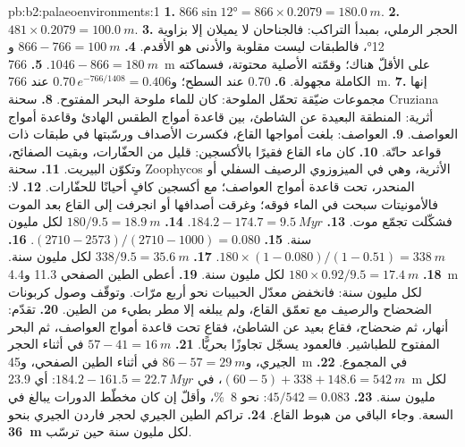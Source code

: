 \begin{solution}{pb:b2:palaeoenvironments:1}
\textbf{1.} $866 \sin \ang{12} = 866 \times 0.2079 = \qty{180.0}{m}$.
\textbf{2.} $481 \times 0.2079 = \qty{100.0}{m}$.
\textbf{3.} الحجر الرملي، بمبدأ التراكب: فالجناحان لا يميلان إلا بزاوية \ang{12}، فالطبقات ليست
مقلوبة والأدنى هو الأقدم.
\textbf{4.} $866 - 766 = \qty{100}{m}$ و$1046 - 866 = \qty{180}{m}$.
\textbf{5.} \qty{766}{m} على الأقلّ هناك؛ وقمّته الأصلية محتوتة، فسماكته الكاملة
مجهولة.
\textbf{6.} 0.70 عند السطح؛ و$0.70\,e^{-766/1408} = 0.406$ عند \qty{766}{m}.
\textbf{7.} إنها مجموعات ضيّقة تحمّل الملوحة: كان للماء ملوحة البحر المفتوح.
\textbf{8.} سحنة Cruziana أثرية: المنطقة البعيدة عن الشاطئ، بين قاعدة أمواج الطقس الهادئ وقاعدة أمواج
العواصف.
\textbf{9.} العواصف: بلغت أمواجها القاع، فكسرت الأصداف ورسّبتها في طبقات
ذات قواعد حاتّة.
\textbf{10.} كان ماء القاع فقيرًا بالأكسجين: قليل من الحفّارات، وبقيت الصفائح، وتكوّن البيريت.
\textbf{11.} سحنة Zoophycos الأثرية، وهي في الميزوزوي الرصيف السفلي أو المنحدر، تحت
قاعدة أمواج العواصف؛ مع أكسجين كافٍ أحيانًا للحفّارات.
\textbf{12.} لا: فالأمونيتات سبحت في الماء فوقه؛ وغرقت أصدافها أو انجرفت إلى القاع
بعد الموت فشكّلت تجمّع موت.
\textbf{13.} $184.2 - 174.7 = \qty{9.5}{Myr}$.
\textbf{14.} $180/9.5 = \qty{18.9}{m}$ لكل مليون سنة.
\textbf{15.} $(2710 - 2573)/(2710 - 1000) = 0.080$.
\textbf{16.} $180 \times (1 - 0.080)/(1 - 0.51) = \qty{338}{m}$.
\textbf{17.} $338/9.5 = \qty{35.6}{m}$ لكل مليون سنة.
\textbf{18.} $180 \times 0.92/9.5 = \qty{17.4}{m}$ لكل مليون سنة.
\textbf{19.} أعطى الطين الصفحي 11.3 و\qty{4.4}{m} لكل مليون سنة: فانخفض معدّل الحبيبات
نحو أربع مرّات. وتوقّف وصول كربونات الضحضاح والرصيف مع تعمّق
القاع، ولم يبلغه إلا مطر بطيء من الطين.
\textbf{20.} تقدّم: أنهار، ثم ضحضاح، فقاع بعيد عن الشاطئ، فقاع تحت قاعدة أمواج
العواصف، ثم البحر المفتوح للطباشير. فالعمود يسجّل تجاوزًا بحريًّا.
\textbf{21.} $57 - 41 = \qty{16}{m}$ في أثناء الحجر الجيري، و$86 - 57 = \qty{29}{m}$ في أثناء الطين الصفحي،
و\qty{45}{m} في المجموع.
\textbf{22.} $(60 - 5) + 338 + 148.6 = \qty{542}{m}$، في $184.2 - 161.5 = \qty{22.7}{Myr}$:
أي \qty{23.9}{m} لكل مليون سنة.
\textbf{23.} $45/542 = 0.083$: نحو \qty{8}{\percent}، وأقلّ إن كان مخطّط الدورات يبالغ في
السعة. وجاء الباقي من هبوط القاع.
\textbf{24.} تراكم الطين الجيري لحجر فاردن الجيري بنحو
\textbf{\qty[text-series-to-math=true]{36}{m}} لكل مليون سنة حين ترسّب.
\end{solution}
